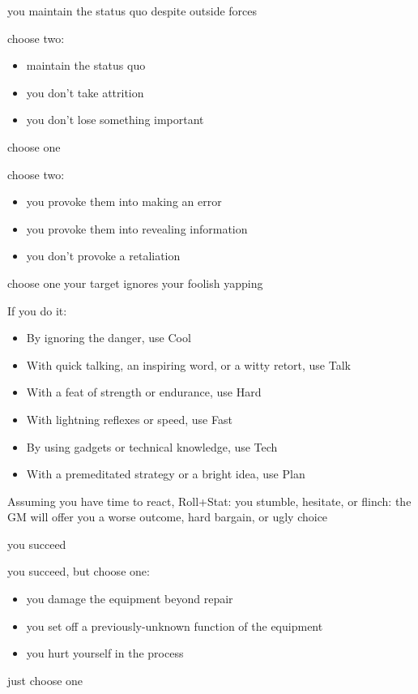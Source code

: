 {you maintain the status quo despite outside forces}
{choose two:
\begin{itemize}
\item maintain the status quo
\item you don't take attrition
\item you don't lose something important
\end{itemize}}
{choose one}

{choose two:
\begin{itemize}
\item you provoke them into making an error
\item you provoke them into revealing information
\item you don't provoke a retaliation
\end{itemize}}
{choose one}
{your target ignores your foolish yapping}

If you do it:
\begin{itemize}
\item By ignoring the danger, use Cool
\item With quick talking, an inspiring word, or a witty retort, use Talk
\item With a feat of strength or endurance, use Hard
\item With lightning reflexes or speed, use Fast
\item By using gadgets or technical knowledge, use Tech
\item With a premeditated strategy or a bright idea, use Plan
\end{itemize}
Assuming you have time to react, Roll+Stat:
{you stumble, hesitate, or flinch: the GM will offer you a worse outcome, hard bargain, or ugly choice}

{you succeed}
{you succeed, but choose one:
\begin{itemize}
\item you damage the equipment beyond repair
\item you set off a previously-unknown function of the equipment
\item you hurt yourself in the process
\end{itemize}}
{just choose one}

